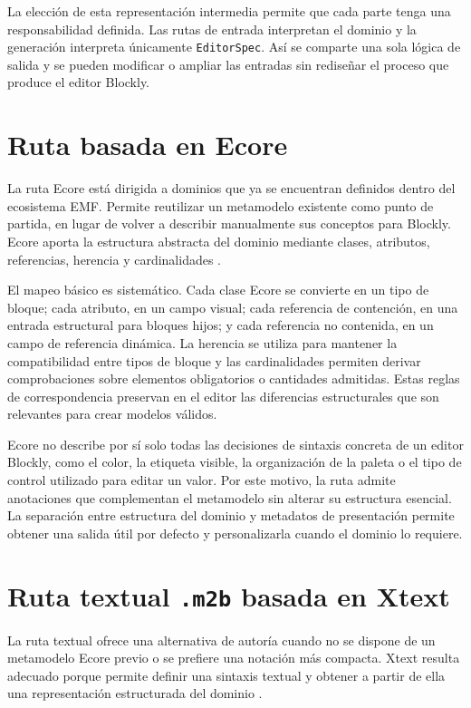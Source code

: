 La elección de esta representación intermedia permite que cada parte tenga una
responsabilidad definida. Las rutas de entrada interpretan el dominio y la
generación interpreta únicamente \texttt{EditorSpec}. Así se comparte una sola
lógica de salida y se pueden modificar o ampliar las entradas sin rediseñar el
proceso que produce el editor Blockly.

\section{Ruta basada en Ecore}
\label{sec:ruta-ecore}

La ruta Ecore está dirigida a dominios que ya se encuentran definidos dentro
del ecosistema EMF. Permite reutilizar un metamodelo existente como punto de
partida, en lugar de volver a describir manualmente sus conceptos para Blockly.
Ecore aporta la estructura abstracta del dominio mediante clases, atributos,
referencias, herencia y cardinalidades \cite{emfOverview}.

El mapeo básico es sistemático. Cada clase Ecore se convierte en un tipo de
bloque; cada atributo, en un campo visual; cada referencia de contención, en una
entrada estructural para bloques hijos; y cada referencia no contenida, en un
campo de referencia dinámica. La herencia se utiliza para mantener la
compatibilidad entre tipos de bloque y las cardinalidades permiten derivar
comprobaciones sobre elementos obligatorios o cantidades admitidas. Estas reglas
de correspondencia preservan en el editor las diferencias estructurales que son
relevantes para crear modelos válidos.

Ecore no describe por sí solo todas las decisiones de sintaxis concreta de un
editor Blockly, como el color, la etiqueta visible, la organización de la
paleta o el tipo de control utilizado para editar un valor. Por este motivo, la
ruta admite anotaciones que complementan el metamodelo sin alterar su estructura
esencial. La separación entre estructura del dominio y metadatos de presentación
permite obtener una salida útil por defecto y personalizarla cuando el dominio
lo requiere.

\section{Ruta textual \texttt{.m2b} basada en Xtext}
\label{sec:ruta-xtext}

La ruta textual ofrece una alternativa de autoría cuando no se dispone de un
metamodelo Ecore previo o se prefiere una notación más compacta. Xtext resulta
adecuado porque permite definir una sintaxis textual y obtener a partir de ella
una representación estructurada del dominio \cite{xtextProject,bettini2013xtext}.

